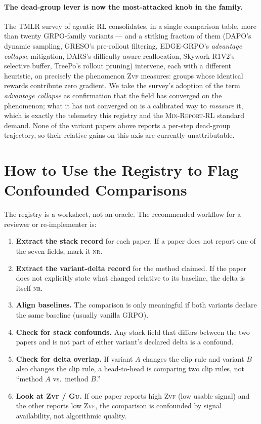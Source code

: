 \documentclass[11pt]{article}
\newcommand{\nr}{\textsc{nr}}
\newcommand{\zvf}{\textsc{Zvf}}
\newcommand{\gu}{\textsc{Gu}}
\newcommand{\minreport}{\textsc{Min-Report-RL}}
\newcommand{\grpo}{\textsc{GRPO}}
\begin{document}
\paragraph{The dead-group lever is now the most-attacked knob in the family.}
The TMLR survey of agentic RL \cite{agenticrlsurvey2026} consolidates, in a single
comparison table, more than twenty \grpo{}-family variants --- and a striking
fraction of them (DAPO's dynamic sampling, GRESO's pre-rollout filtering,
EDGE-\grpo{}'s \emph{advantage collapse} mitigation, DARS's difficulty-aware
reallocation, Skywork-R1V2's selective buffer, TreePo's rollout pruning)
intervene, each with a different heuristic, on precisely the phenomenon
\zvf{} measures: groups whose identical rewards contribute zero gradient.
We take the survey's adoption of the term \emph{advantage collapse} as
confirmation that the field has converged on the phenomenon; what it has not
converged on is a calibrated way to \emph{measure} it, which is exactly the
telemetry this registry and the \minreport{} standard demand. None of the
variant papers above reports a per-step dead-group trajectory, so their
relative gains on this axis are currently unattributable.

\section{How to Use the Registry to Flag Confounded Comparisons}
\label{sec:usage}


The registry is a worksheet, not an oracle. The recommended workflow for a
reviewer or re-implementer is:

\begin{enumerate}[leftmargin=1.6em, itemsep=2pt]
  \item \textbf{Extract the stack record} for each paper. If a paper does not
    report one of the seven fields, mark it \nr{}.
  \item \textbf{Extract the variant-delta record} for the method claimed. If
    the paper does not explicitly state what changed relative to its baseline,
    the delta is itself \nr{}.
  \item \textbf{Align baselines.} The comparison is only meaningful if both
    variants declare the same baseline (usually vanilla \grpo{}).
  \item \textbf{Check for stack confounds.} Any stack field that differs
    between the two papers and is not part of either variant's declared delta
    is a confound.
  \item \textbf{Check for delta overlap.} If variant $A$ changes the clip rule
    and variant $B$ also changes the clip rule, a head-to-head is comparing two
    clip rules, not ``method $A$ vs.\ method $B$.''
  \item \textbf{Look at \zvf{} / \gu{}.} If one paper reports high \zvf{}
    (low usable signal) and the other reports low \zvf{}, the comparison is
    confounded by signal availability, not algorithmic quality.
\end{enumerate}
\end{document}
